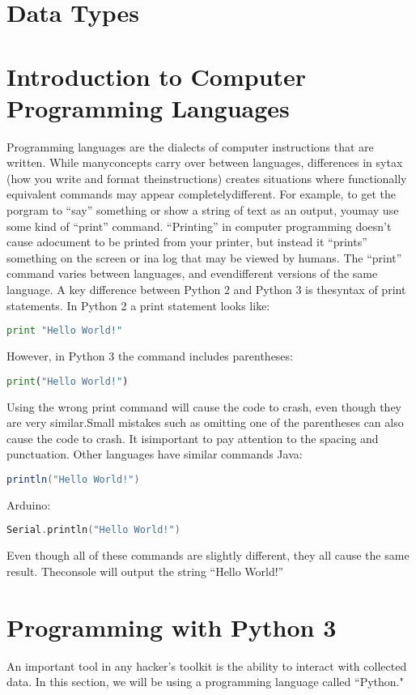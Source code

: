 \section{Data Types}

\section{Introduction to Computer Programming Languages}
	Programming languages are the dialects of computer instructions that are written. While manyconcepts carry over between languages, differences in sytax (how you write and format theinstructions) creates situations where functionally equivalent commands may appear completelydifferent.
	For example, to get the porgram to ``say'' something or show a string of text as an output, youmay use some kind of ``print'' command. ``Printing'' in computer programming doesn't cause adocument to be printed from your printer, but instead it ``prints'' something on the screen or ina log that may be viewed by humans. The ``print'' command varies between languages, and evendifferent versions of the same language. A key difference between Python 2 and Python 3 is thesyntax of print statements. In Python 2 a print statement looks like:
	\begin{lstlisting}[language=python, autogobble=true]
       	print "Hello World!"
       \end{lstlisting}
       However, in Python 3 the command includes parentheses:
       \begin{lstlisting}[language=python, autogobble=true]
       	print("Hello World!")
       \end{lstlisting}
       Using the wrong print command will cause the code to crash, even though they are very similar.Small mistakes such as omitting one of the parentheses can also cause the code to crash. It isimportant to pay attention to the spacing and punctuation. Other languages have similar commands
       Java: 
       \begin{lstlisting}[language=java, autogobble=true]
       	println("Hello World!")
       \end{lstlisting}
       Arduino:
       \begin{lstlisting}[language=c, autogobble=true]
       	Serial.println("Hello World!")
    \end{lstlisting}
    Even though all of these commands are slightly different, they all cause the same result. Theconsole will output the string ``Hello World!''
\section{Programming with Python 3}
  	An important tool in any hacker's toolkit is the ability to interact with collected data. In this section, we will be using a programming language called ``Python."
